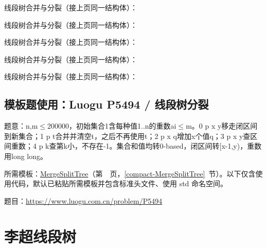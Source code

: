 \noindent 线段树合并与分裂（接上页同一结构体）：



\newpage

\noindent 线段树合并与分裂（接上页同一结构体）：



\newpage

\noindent 线段树合并与分裂（接上页同一结构体）：



\newpage

\noindent 线段树合并与分裂（接上页同一结构体）：



\newpage

\noindent 线段树合并与分裂（接上页同一结构体）：



\Needspace{680pt}

\subsection*{模板题使用：Luogu P5494 / 线段树分裂}

\label{usage-example-249}

题意：n,m$\le$200000，初始集合1含每种值1..n的重数ai$\le$m。0 p x y移走闭区间到新集合；1 p t合并并清空t，之后不再使用t；2 p x q增加x个值q；3 p x y查区间重数；4 p k查第k小，不存在-1。集合和值均转0-based，闭区间转[x-1,y)，重数用long long。

所需模板：\hyperref[compact-MergeSplitTree]{MergeSplitTree}（第~\pageref{compact-MergeSplitTree}~页，\ref{compact-MergeSplitTree}~节）。以下仅含使用代码，默认已粘贴所需模板并包含标准头文件、使用 std 命名空间。

题目：\url{https://www.luogu.com.cn/problem/P5494}



\Needspace{574pt}

\section{李超线段树}

